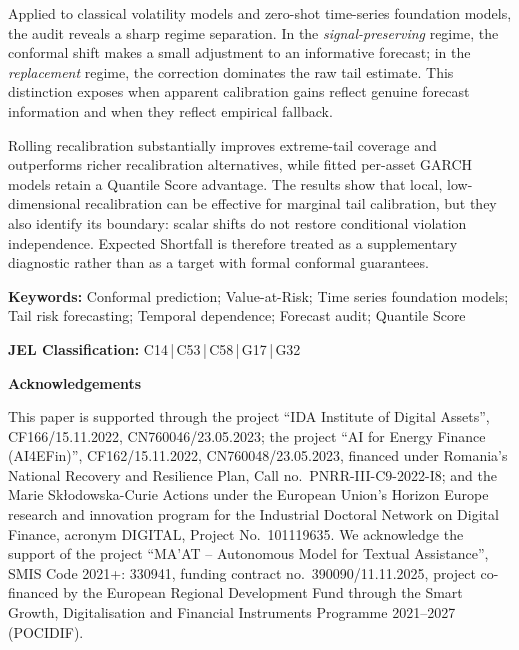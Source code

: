 \documentclass[11pt]{article}
\begin{document}
Applied to classical volatility models and zero-shot time-series foundation models, the audit reveals a sharp regime separation. In the \emph{signal-preserving} regime, the conformal shift makes a small adjustment to an informative forecast; in the \emph{replacement} regime, the correction dominates the raw tail estimate. This distinction exposes when apparent calibration gains reflect genuine forecast information and when they reflect empirical fallback.

Rolling recalibration substantially improves extreme-tail coverage and outperforms richer recalibration alternatives, while fitted per-asset GARCH models retain a Quantile Score advantage. The results show that local, low-dimensional recalibration can be effective for marginal tail calibration, but they also identify its boundary: scalar shifts do not restore conditional violation independence. Expected Shortfall is therefore treated as a supplementary diagnostic rather than as a target with formal conformal guarantees.

\medskip

\noindent\textbf{Keywords:} Conformal prediction; Value-at-Risk; Time series foundation models; Tail risk forecasting; Temporal dependence; Forecast audit; Quantile Score

\smallskip

\noindent\textbf{JEL Classification:} C14\,|\,C53\,|\,C58\,|\,G17\,|\,G32

\vspace{0.4cm}

\noindent\textbf{Acknowledgements}

\smallskip

\noindent\footnotesize
This paper is supported through the project ``IDA Institute of Digital Assets'', CF166/15.11.2022, CN760046/23.05.2023; the project ``AI for Energy Finance (AI4EFin)'', CF162/15.11.2022, CN760048/23.05.2023, financed under Romania's National Recovery and Resilience Plan, Call no.\ PNRR-III-C9-2022-I8; and the Marie Sk\l{}odowska-Curie Actions under the European Union's Horizon Europe research and innovation program for the Industrial Doctoral Network on Digital Finance, acronym DIGITAL, Project No.\ 101119635.
We acknowledge the support of the project ``MA'AT -- Autonomous Model for Textual Assistance'', SMIS Code 2021+: 330941, funding contract no.\ 390090/11.11.2025, project co-financed by the European Regional Development Fund through the Smart Growth, Digitalisation and Financial Instruments Programme 2021--2027 (POCIDIF).
\end{document}
